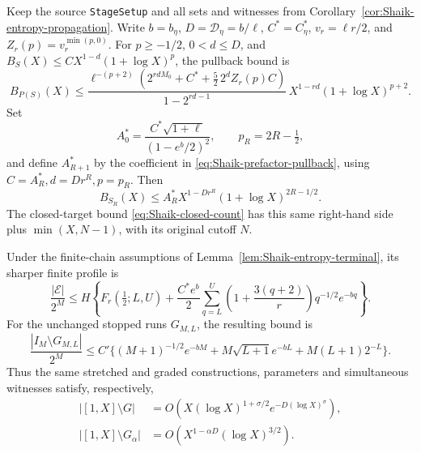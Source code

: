 \begin{corollary}
\label{cor:Shaik-prefactor-propagation}
Keep the source \texttt{StageSetup} and all sets and witnesses from
Corollary~\ref{cor:Shaik-entropy-propagation}.
Write \(b=b_\eta\), \(D=\mathcal D_\eta=b/\ell\),
\(C^*=C_\eta^*\), \(v_r=\ell r/2\), and
\(Z_r(p)=v_r^{\min(p,0)}\).
For \(p\ge-1/2\), \(0<d\le D\), and
\(B_S(X)\le C X^{1-d}(1+\log X)^p\), the pullback bound is
\begin{equation}\label{eq:Shaik-prefactor-pullback}
 B_{P(S)}(X)\le
 \frac{\ell^{-(p+2)}
  (2^{rdM_0}+C^*+\frac52\,2^d Z_r(p)C)}
 {1-2^{rd-1}}\,
 X^{1-rd}(1+\log X)^{p+2}.
\end{equation}
Set
\[
 A_0^*=\frac{C^*\sqrt{1+\ell}}{(1-e^b/2)^2},\qquad
 p_R=2R-\tfrac12,
\]
and define \(A_{R+1}^*\) by the coefficient in
\eqref{eq:Shaik-prefactor-pullback}, using
\(C=A_R^*,d=Dr^R,p=p_R\). Then
\begin{equation}\label{eq:Shaik-prefactor-iterate}
 B_{S_R}(X)\le A_R^*X^{1-Dr^R}(1+\log X)^{2R-1/2}.
\end{equation}
The closed-target bound \eqref{eq:Shaik-closed-count} has this same
right-hand side plus \(\min(X,N-1)\), with its original cutoff \(N\).

Under the finite-chain assumptions of
Lemma~\ref{lem:Shaik-entropy-terminal}, its sharper finite profile is
\begin{equation}\label{eq:Shaik-prefactor-terminal}
 \frac{|\mathcal E|}{2^M}\le H\left\{F_r(\tfrac12;L,U)
 +\frac{C^*e^b}{2}
   \sum_{q=L}^U\left(1+\frac{3(q+2)}r\right)q^{-1/2}e^{-bq}\right\}.
\end{equation}
For the unchanged stopped runs \(G_{M,L}\), the resulting bound is
\begin{equation}\label{eq:Shaik-prefactor-fixed-failure}
 \frac{|I_M\setminus G_{M,L}|}{2^M}
 \le C'\{(M+1)^{-1/2}e^{-bM}
       +M\sqrt{L+1}e^{-bL}+M(L+1)2^{-L}\}.
\end{equation}
Thus the same stretched and graded constructions, parameters and
simultaneous witnesses satisfy, respectively,
\begin{align}
 |[1,X]\setminus G|
 &=O\!\left(X(\log X)^{1+\sigma/2}
                    e^{-D(\log X)^\sigma}\right),
 \label{eq:Shaik-prefactor-stretched}\\
 |[1,X]\setminus G_\alpha|
 &=O\!\left(X^{1-\alpha D}(\log X)^{3/2}\right).
 \label{eq:Shaik-prefactor-graded}
\end{align}
\end{corollary}
